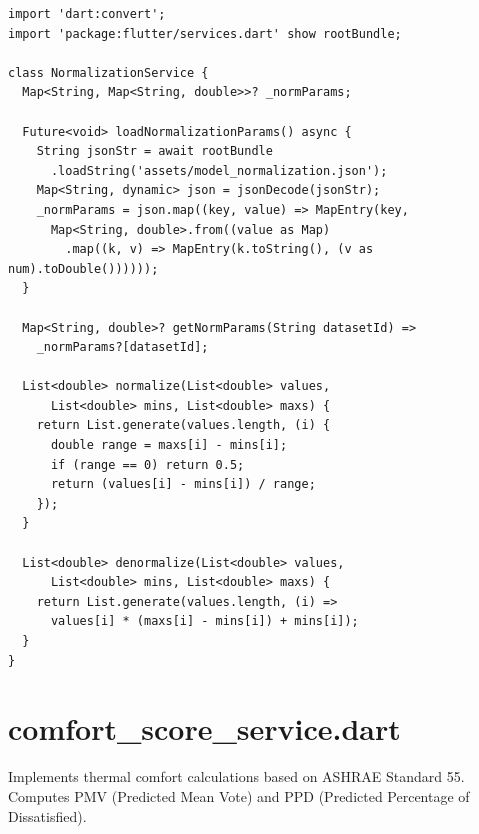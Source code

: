 \documentclass[12pt,a4paper,oneside]{report}
\begin{document}
\begin{lstlisting}[style=dartstyle]
import 'dart:convert';
import 'package:flutter/services.dart' show rootBundle;

class NormalizationService {
  Map<String, Map<String, double>>? _normParams;

  Future<void> loadNormalizationParams() async {
    String jsonStr = await rootBundle
      .loadString('assets/model_normalization.json');
    Map<String, dynamic> json = jsonDecode(jsonStr);
    _normParams = json.map((key, value) => MapEntry(key,
      Map<String, double>.from((value as Map)
        .map((k, v) => MapEntry(k.toString(), (v as num).toDouble())))));
  }

  Map<String, double>? getNormParams(String datasetId) =>
    _normParams?[datasetId];

  List<double> normalize(List<double> values,
      List<double> mins, List<double> maxs) {
    return List.generate(values.length, (i) {
      double range = maxs[i] - mins[i];
      if (range == 0) return 0.5;
      return (values[i] - mins[i]) / range;
    });
  }

  List<double> denormalize(List<double> values,
      List<double> mins, List<double> maxs) {
    return List.generate(values.length, (i) =>
      values[i] * (maxs[i] - mins[i]) + mins[i]);
  }
}
\end{lstlisting}

\section{comfort\_score\_service.dart}

Implements thermal comfort calculations based on ASHRAE Standard 55. Computes PMV (Predicted Mean Vote) and PPD (Predicted Percentage of Dissatisfied).
\end{document}
